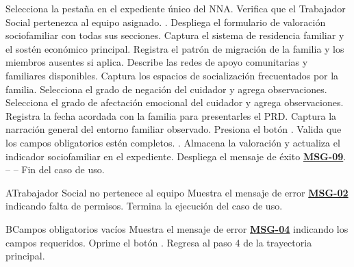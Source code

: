 \begin{UCtrayectoria}
	\UCpaso[\UCactor] Selecciona la pestaña  en el expediente único del NNA.
	\UCpaso Verifica que el Trabajador Social pertenezca al equipo asignado. .
	\UCpaso Despliega el formulario de valoración sociofamiliar con todas sus secciones.
	\UCpaso[\UCactor] Captura el sistema de residencia familiar y el sostén económico principal.
	\UCpaso[\UCactor] Registra el patrón de migración de la familia y los miembros ausentes si aplica.
	\UCpaso[\UCactor] Describe las redes de apoyo comunitarias y familiares disponibles.
	\UCpaso[\UCactor] Captura los espacios de socialización frecuentados por la familia.
	\UCpaso[\UCactor] Selecciona el grado de negación del cuidador y agrega observaciones.
	\UCpaso[\UCactor] Selecciona el grado de afectación emocional del cuidador y agrega observaciones.
	\UCpaso[\UCactor] Registra la fecha acordada con la familia para presentarles el PRD.
	\UCpaso[\UCactor] Captura la narración general del entorno familiar observado.
	\UCpaso[\UCactor] Presiona el botón .
	\UCpaso Valida que los campos obligatorios estén completos. .
	\UCpaso Almacena la valoración y actualiza el indicador sociofamiliar en el expediente.
	\UCpaso Despliega el mensaje de éxito \hyperlink{mMSG09}{\bf MSG-09}.
	\UCpaso[] -- -- Fin del caso de uso.
\end{UCtrayectoria}

\begin{UCtrayectoriaA}{A}{Trabajador Social no pertenece al equipo}
	\UCpaso Muestra el mensaje de error \hyperlink{mMSG02}{\bf MSG-02} indicando falta de permisos.
	\UCpaso Termina la ejecución del caso de uso.
\end{UCtrayectoriaA}

\begin{UCtrayectoriaA}{B}{Campos obligatorios vacíos}
	\UCpaso Muestra el mensaje de error \hyperlink{mMSG04}{\bf MSG-04} indicando los campos requeridos.
	\UCpaso[\UCactor] Oprime el botón .
	\UCpaso Regresa al paso 4 de la trayectoria principal.
\end{UCtrayectoriaA}

